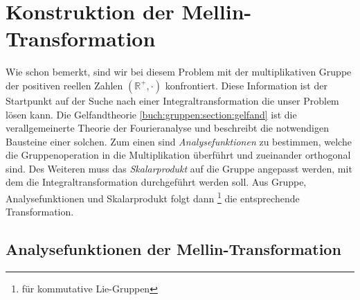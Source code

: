%
%
%

\section{Konstruktion der Mellin-Transformation
\label{mellin:section:teil2}}
Wie schon bemerkt, sind wir bei diesem Problem mit der multiplikativen Gruppe der positiven reellen Zahlen $(\mathbb{R^+},\cdot)$ 
konfrontiert. 
Diese Information ist der Startpunkt auf der Suche nach einer Integraltransformation die unser Problem lösen kann.
Die Gelfandtheorie \ref{buch:gruppen:section:gelfand} ist die verallgemeinerte Theorie der Fourieranalyse und beschreibt die notwendigen Bausteine einer solchen.
Zum einen sind \emph{Analysefunktionen} zu bestimmen, welche die Gruppenoperation in die Multiplikation überführt und zueinander 
orthogonal sind. 
Des Weiteren muss das \emph{Skalarprodukt} auf die Gruppe angepasst werden, mit dem die Integraltransformation durchgeführt werden 
soll.
Aus Gruppe, Analysefunktionen und Skalarprodukt folgt dann \footnote{für kommutative Lie-Gruppen} die entsprechende Transformation.






\subsection{Analysefunktionen der Mellin-Transformation
\label{mellin:subsection:analysefunktionen}}

